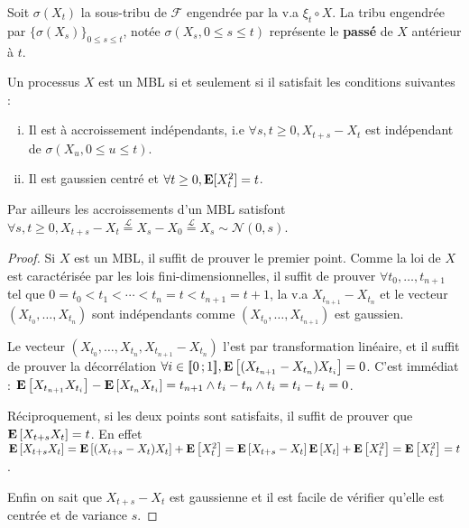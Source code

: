	\begin{defn}
		Soit $\sigma(X_t)$ la sous-tribu de $\mathcal{F}$ engendrée par la v.a $\xi_t \circ X$.
		La tribu engendrée par $\{ \sigma(X_s) \}_{0 \leq s \leq t}$, notée $\sigma(X_s, 0 \leq s \leq t)$ représente le \textbf{passé} de $X$ antérieur à $t$.
	\end{defn}
	
	\begin{pop}
		Un processus $X$ est un MBL si et seulement si il satisfait les conditions suivantes :
		\begin{enumerate}[(i)]
			\item Il est à accroissement indépendants, i.e $\forall s,t \geq 0, X_{t+s} - X_t$ est indépendant de $\sigma(X_u, 0 \leq u \leq t)$.
			\item Il est gaussien centré et $\forall t \geq 0, \mathbf{E}[X_t^2] = t$.
		\end{enumerate}
		Par ailleurs les accroissements d'un MBL satisfont $\forall s,t \geq 0, X_{t+s} - X_t \overset{\mathcal{L}}{=} X_s - X_0 \overset{\mathcal{L}}{=} X_s \sim \mathcal{N}(0,s)$.
	\end{pop}
	
	\begin{proof}
		Si $X$ est un MBL, il suffit de prouver le premier point.
		Comme la loi de $X$ est caractérisée par les lois fini-dimensionnelles, il suffit de prouver $\forall t_0,\ldots,t_{n + 1}$ tel que $0 = t_0 < t_1 < \cdots < t_n = t < t_{n + 1} = t + 1$, la v.a $X_{t_{n + 1}} - X_{t_n}$ et le vecteur $(X_{t_0},\ldots,X_{t_n})$ sont indépendants comme $(X_{t_0},\ldots,X_{t_{n + 1}})$ est gaussien.
		
		Le vecteur $(X_{t_0},\ldots,X_{t_n},X_{t_{n + 1}} - X_{t_n})$ l'est par transformation linéaire, et il suffit de prouver la décorrélation $\forall i \in \mathopen{[\![}0\mathclose{}\mathpunct{};1\mathclose{]\!]}, \mathbf{E} \left[ (X_{t_{n + 1}} - X_{t_n}) X_{t_i} \right] = 0$.
		C'est immédiat : $\mathbf{E} \left[ X_{t_{n + 1}} X_{t_i} \right] - \mathbf{E} \left[ X_{t_n} X_{t_i} \right] = t_{n + 1} \wedge t_i - t_n \wedge t_i = t_i - t_i = 0$.
		
		Réciproquement, si les deux points sont satisfaits, il suffit de prouver que $\mathbf{E} \left[ X_{t + s} X_t \right] = t$.
		En effet $\mathbf{E} \left[ X_{t + s} X_t \right] = \mathbf{E} \left[ (X_{t + s} - X_t) X_t \right] + \mathbf{E} \left[ X_t^2 \right] = \mathbf{E} \left[ X_{t + s} - X_t \right] \mathbf{E} \left[ X_t \right] + \mathbf{E} \left[ X_t^2 \right] = \mathbf{E} \left[ X_t^2 \right] = t$.
		
		Enfin on sait que $X_{t + s} - X_t$ est gaussienne et il est facile de vérifier qu'elle est centrée et de variance $s$.
	\end{proof}
	

